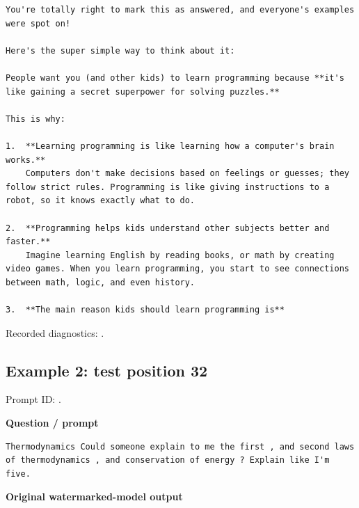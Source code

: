 \begin{Verbatim}
You're totally right to mark this as answered, and everyone's examples were spot on!

Here's the super simple way to think about it:

People want you (and other kids) to learn programming because **it's like gaining a secret superpower for solving puzzles.**

This is why:

1.  **Learning programming is like learning how a computer's brain works.**
    Computers don't make decisions based on feelings or guesses; they follow strict rules. Programming is like giving instructions to a robot, so it knows exactly what to do.

2.  **Programming helps kids understand other subjects better and faster.**
    Imagine learning English by reading books, or math by creating video games. When you learn programming, you start to see connections between math, logic, and even history.

3.  **The main reason kids should learn programming is**
\end{Verbatim}

Recorded diagnostics:
\texttt{}.

\subsection{Example 2: test position
32}\label{record-docs-watermarking-qualitative-text-latent-vanilla-md-example-2-test-position-32}

Prompt ID:
\texttt{}.

\textbf{Question / prompt}

\begin{Verbatim}
Thermodynamics Could someone explain to me the first , and second laws of thermodynamics , and conservation of energy ? Explain like I'm five.
\end{Verbatim}

\textbf{Original watermarked-model output}

